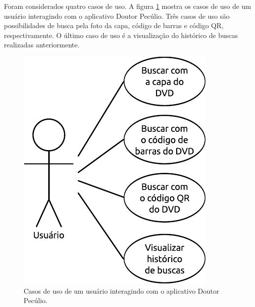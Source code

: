 


Foram considerados quatro casos de uso.  A figura \ref{fig:casos} mostra os
casos de uso de um usuário interagindo com o aplicativo Doutor Pecúlio.
Três casos de uso são possibilidades de busca pela foto da capa, 
código de barras e código QR, respectivamente.   O último caso de uso é
a visualização do histórico de buscas realizadas anteriormente.

\begin{figure}[h]
    \centering
    \includegraphics[scale=1]{casos/caso1}
    \caption{ \label{fig:casos} Casos de uso de um usuário interagindo com
        o aplicativo Doutor Pecúlio. }
\end{figure}
